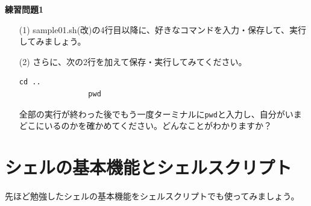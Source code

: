 \documentclass[a4j]{ltjreport}
\begin{document}


    \begin{itembox}[l]{\textbf{練習問題1}}
        \begin{itemize}
            \item[(1)] sample01.sh(改)の4行目以降に、好きなコマンドを入力・保存して、実行してみましょう。
            \item[(2)] さらに、次の2行を加えて保存・実行してみてください。
            \begin{lstlisting}[numbers=none]
                cd ..
                pwd
            \end{lstlisting}
            全部の実行が終わった後でもう一度ターミナルに\texttt{pwd}と入力し、自分がいまどこにいるのかを確かめてください。どんなことがわかりますか？
        \end{itemize}
    \end{itembox}

    \newpage
    \section{シェルの基本機能とシェルスクリプト}
    先ほど勉強したシェルの基本機能をシェルスクリプトでも使ってみましょう。
\end{document}

